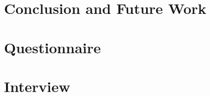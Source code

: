 \section{Conclusion and Future Work}


\begin{acks}

\end{acks}




\appendix
\section{Questionnaire}

\section{Interview}
